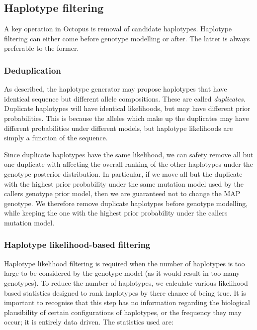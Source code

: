 \documentclass{article}
\begin{document}
\subsection{Haplotype filtering}\label{haplotype-filtering}

A key operation in Octopus is removal of candidate haplotypes. Haplotype filtering can either come before genotype modelling or after. The latter is always preferable to the former.

\subsubsection{Deduplication}\label{haplotype-deduplication}

As described, the haplotype generator may propose haplotypes that have identical sequence but different allele compositions. These are called \emph{duplicates}. Duplicate haplotypes will have identical likelihoods, but may have different prior probabilities. This is because the alleles which make up the duplicates may have different probabilities under different models, but haplotype likelihoods are simply a function of the sequence.

Since duplicate haplotypes have the same likelihood, we can safety remove all but one duplicate with affecting the overall ranking of the other haplotypes under the genotype posterior distribution. In particular, if we move all but the duplicate with the highest prior probability under the same mutation model used by the callers genotype prior model, then we are guaranteed not to change the MAP genotype. We therefore remove duplicate haplotypes before genotype modelling, while keeping the one with the highest prior probability under the callers mutation model.

\subsubsection{Haplotype likelihood-based filtering}\label{haplotype-likelihood-filtering}

Haplotype likelihood filtering is required when the number of haplotypes is too large to be considered by the genotype model (as it would result in too many genotypes). To reduce the number of haplotypes, we calculate various likelihood based statistics designed to rank haplotypes by there chance of being true. It is important to recognise that this step has no information regarding the biological plausibility of certain configurations of haplotypes, or the frequency they may occur; it is entirely data driven. The statistics used are:
\end{document}
